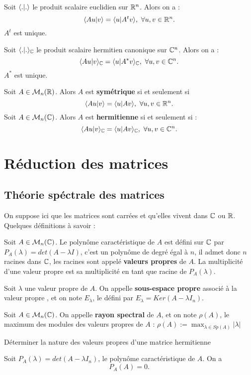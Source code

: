 \medskip
{}
Soit $\langle.|.\rangle$ le produit scalaire euclidien sur $\mathbb{R}^n$. Alors on a :\\
$$\langle Au |v \rangle = \langle u |A^t v \rangle, ~ \forall u,v \in \mathbb{R}^n.$$
$A^t$ est unique.
\ep

\medskip
{}
Soit $\langle.|.\rangle_{\mathbb{C}}$ le produit scalaire hermitien canonique sur $\mathbb{C}^n$. Alors on a :
$$\langle Au |v \rangle_{\mathbb{C}} = \langle u | A^* v \rangle_{\mathbb{C}}, ~ \forall u,v \in \mathbb{C}^n.$$
$A^*$ est unique.
\ep

\medskip
{}
Soit $A \in \mathcal{M}_n(\mathbb{R})$. Alors $A$ est \textbf{symétrique} si et seulement si $$\langle Au |v \rangle = \langle u |A v \rangle, ~ \forall u,v \in \mathbb{R}^n.$$
\ep
\medskip
{}
Soit $A \in \mathcal{M}_n(\mathbb{C})$. Alors $A$ est \textbf{hermitienne} si et seulement si : $$\langle Au |v \rangle_{\mathbb{C}} = \langle u | A v \rangle_{\mathbb{C}}, ~ \forall u,v \in \mathbb{C}^n.$$
\ep
\newpage
\section{Réduction des matrices}
\subsection{Théorie spéctrale des matrices}
On suppose ici que les matrices sont carrées et qu'elles vivent dans $\mathbb{C}$ ou $\mathbb{R}$.
\bd
Quelques définitions à savoir : 
\ben
	\item Soit $A \in \mathcal{M}_n(\mathbb{C})$. Le polynôme caractéristique de $A$ est défini sur $\mathbb{C}$ par $P_A(\lambda) = det (A - \lambda I )$, c'est un polynôme de degré égal à $n$, il admet donc $n$ racines dans $\mathbb{C}$, les racines sont appelé \textbf{valeurs propres} de $A$. La multiplicité d'une valeur propre est sa multiplicité en tant que racine de $P_A(\lambda)$.
	\item Soit $\lambda$ une valeur propre de $A$. On appelle \textbf{sous-espace propre} associé à la valeur propre \lambda, et on note $E_{\lambda}$, le \sev défini par $E_{\lambda} = Ker(A-\lambda I_n)$.
	\item Soit $A \in \mathcal{M}_n(\mathbb{C})$. On appelle  \textbf{rayon spectral} de $A$, et on note $\rho(A)$, le maximum des modules des valeurs propres de $A$ : $\displaystyle \rho(A) := \max_{\lambda \in Sp(A)} |\lambda |$
\een
\ed

\be 
Déterminer la nature des valeurs propres d'une matrice hermitienne
\ee

Soit $P_A(\lambda) = det(A - \lambda I_n)$, le polynôme caractéristique de $A$. On a $$P_A(A) = 0.$$
\ep

